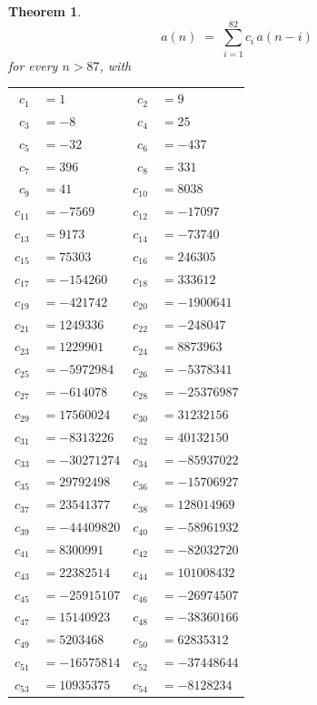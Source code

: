 \documentclass[11pt,a4paper]{article}
\theoremstyle{plain}
\newtheorem{theorem}{Theorem}
\theoremstyle{definition}
\begin{document}
\begin{theorem}
\[
a(n)\;=\;\sum_{i=1}^{82}c_i\,a(n-i)
\]
for every $n>87$, with
\begin{center}\footnotesize
\begin{tabular}{r@{\,}l@{\qquad}r@{\,}l}
$c_{1}$ & $=1$ & $c_{2}$ & $=9$ \\
$c_{3}$ & $=-8$ & $c_{4}$ & $=25$ \\
$c_{5}$ & $=-32$ & $c_{6}$ & $=-437$ \\
$c_{7}$ & $=396$ & $c_{8}$ & $=331$ \\
$c_{9}$ & $=41$ & $c_{10}$ & $=8038$ \\
$c_{11}$ & $=-7569$ & $c_{12}$ & $=-17097$ \\
$c_{13}$ & $=9173$ & $c_{14}$ & $=-73740$ \\
$c_{15}$ & $=75303$ & $c_{16}$ & $=246305$ \\
$c_{17}$ & $=-154260$ & $c_{18}$ & $=333612$ \\
$c_{19}$ & $=-421742$ & $c_{20}$ & $=-1900641$ \\
$c_{21}$ & $=1249336$ & $c_{22}$ & $=-248047$ \\
$c_{23}$ & $=1229901$ & $c_{24}$ & $=8873963$ \\
$c_{25}$ & $=-5972984$ & $c_{26}$ & $=-5378341$ \\
$c_{27}$ & $=-614078$ & $c_{28}$ & $=-25376987$ \\
$c_{29}$ & $=17560024$ & $c_{30}$ & $=31232156$ \\
$c_{31}$ & $=-8313226$ & $c_{32}$ & $=40132150$ \\
$c_{33}$ & $=-30271274$ & $c_{34}$ & $=-85937022$ \\
$c_{35}$ & $=29792498$ & $c_{36}$ & $=-15706927$ \\
$c_{37}$ & $=23541377$ & $c_{38}$ & $=128014969$ \\
$c_{39}$ & $=-44409820$ & $c_{40}$ & $=-58961932$ \\
$c_{41}$ & $=8300991$ & $c_{42}$ & $=-82032720$ \\
$c_{43}$ & $=22382514$ & $c_{44}$ & $=101008432$ \\
$c_{45}$ & $=-25915107$ & $c_{46}$ & $=-26974507$ \\
$c_{47}$ & $=15140923$ & $c_{48}$ & $=-38360166$ \\
$c_{49}$ & $=5203468$ & $c_{50}$ & $=62835312$ \\
$c_{51}$ & $=-16575814$ & $c_{52}$ & $=-37448644$ \\
$c_{53}$ & $=10935375$ & $c_{54}$ & $=-8128234$ \\

\end{tabular}
\end{center}
\end{theorem}
\end{document}
